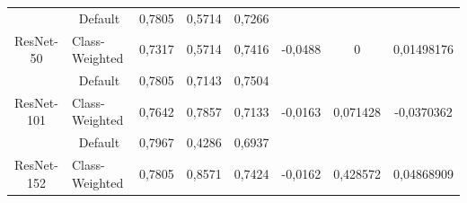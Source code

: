 \begin{table}[hbtp]
\begin{center}
{\begin{tabular}{|c|c|lll|ccc|}
    															 & Default                                                   & \multicolumn{1}{l|}{0,7805}  & \multicolumn{1}{l|}{0,5714} & 0,7266                   & \multicolumn{1}{c|}{}                          & \multicolumn{1}{c|}{}                           &                              \\ \cline{2-5}
    		\multirow{-2}{*}{ResNet-50}                          & \multicolumn{1}{l|}{Class-Weighted}                       & \multicolumn{1}{l|}{0,7317}  & \multicolumn{1}{l|}{0,5714} & 0,7416                   & \multicolumn{1}{c|}{\multirow{-2}{*}{-0,0488}} & \multicolumn{1}{c|}{\multirow{-2}{*}{0}}        & \multirow{-2}{*}{0,01498176} \\ \hline
    															 & Default                                                   & \multicolumn{1}{l|}{0,7805}  & \multicolumn{1}{l|}{0,7143} & 0,7504                   & \multicolumn{1}{c|}{}                          & \multicolumn{1}{c|}{}                           &                              \\ \cline{2-5}
    		\multirow{-2}{*}{ResNet-101}                         & \multicolumn{1}{l|}{Class-Weighted}                       & \multicolumn{1}{l|}{0,7642}  & \multicolumn{1}{l|}{0,7857} & 0,7133                   & \multicolumn{1}{c|}{\multirow{-2}{*}{-0,0163}} & \multicolumn{1}{c|}{\multirow{-2}{*}{0,071428}} & \multirow{-2}{*}{-0,0370362} \\ \hline
    															 & Default                                                   & \multicolumn{1}{l|}{0,7967}  & \multicolumn{1}{l|}{0,4286} & 0,6937                   & \multicolumn{1}{c|}{}                          & \multicolumn{1}{c|}{}                           &                              \\ \cline{2-5}
    		\multirow{-2}{*}{ResNet-152}                         & \multicolumn{1}{l|}{Class-Weighted}                       & \multicolumn{1}{l|}{0,7805}  & \multicolumn{1}{l|}{0,8571} & 0,7424                   & \multicolumn{1}{c|}{\multirow{-2}{*}{-0,0162}} & \multicolumn{1}{c|}{\multirow{-2}{*}{0,428572}} & \multirow{-2}{*}{0,04868909} \\ \hline
    		\end{tabular}
        }
	\end{center}
\end{table}


